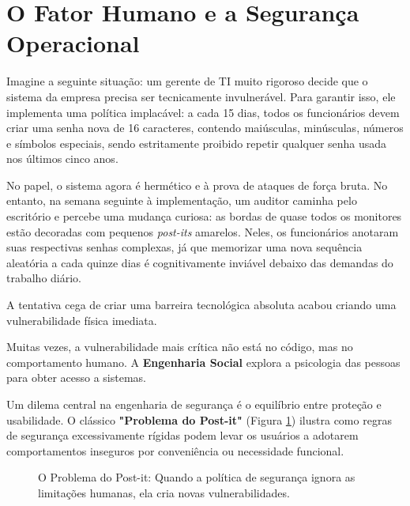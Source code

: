 \documentclass[12pt,a4paper,twoside]{report}
\begin{document}
\section{O Fator Humano e a Segurança Operacional}

Imagine a seguinte situação: um gerente de TI muito rigoroso decide que o sistema da empresa precisa ser tecnicamente invulnerável. Para garantir isso, ele implementa uma política implacável: a cada 15 dias, todos os funcionários devem criar uma senha nova de 16 caracteres, contendo maiúsculas, minúsculas, números e símbolos especiais, sendo estritamente proibido repetir qualquer senha usada nos últimos cinco anos. 

No papel, o sistema agora é hermético e à prova de ataques de força bruta. No entanto, na semana seguinte à implementação, um auditor caminha pelo escritório e percebe uma mudança curiosa: as bordas de quase todos os monitores estão decoradas com pequenos \textit{post-its} amarelos. Neles, os funcionários anotaram suas respectivas senhas complexas, já que memorizar uma nova sequência aleatória a cada quinze dias é cognitivamente inviável debaixo das demandas do trabalho diário.

A tentativa cega de criar uma barreira tecnológica absoluta acabou criando uma vulnerabilidade física imediata.

Muitas vezes, a vulnerabilidade mais crítica não está no código, mas no comportamento humano. A \textbf{Engenharia Social} explora a psicologia das pessoas para obter acesso a sistemas.

Um dilema central na engenharia de segurança é o equilíbrio entre proteção e usabilidade. O clássico \textbf{"Problema do Post-it"} (Figura \ref{fig:postit_problem}) ilustra como regras de segurança excessivamente rígidas podem levar os usuários a adotarem comportamentos inseguros por conveniência ou necessidade funcional.

\begin{figure}[h]
    \centering
    \caption{O Problema do Post-it: Quando a política de segurança ignora as limitações humanas, ela cria novas vulnerabilidades.}
    \label{fig:postit_problem}
\end{figure}
\end{document}
